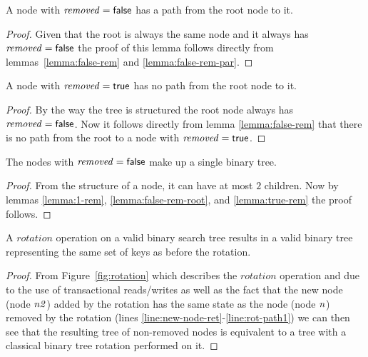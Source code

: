 \begin{lemma}
\label{lemma:false-rem-root}
A node with $\ms{removed}=\lit{false}$ has a path from the root node to it.
\end{lemma}
\begin{proof}
Given that the root is always the same node and it always has $\ms{removed}=\lit{false}$ the proof of this lemma follows directly
from lemmas~\ref{lemma:false-rem} and \ref{lemma:false-rem-par}.
\end{proof}


\begin{lemma}
\label{lemma:true-rem}
A node with $\ms{removed}=\lit{true}$ has no path from the root node to it.
\end{lemma}
\begin{proof}
By the way the tree is structured the root node always has $\ms{removed}=\lit{false}$.
Now it follows directly from lemma \ref{lemma:false-rem} that there is no path from the root to a node with $\ms{removed}=\lit{true}$.
\end{proof}


\begin{lemma}
\label{lemma:binary-tree}
The nodes with $\ms{removed}=\lit{false}$ make up a single binary tree.
\end{lemma}
\begin{proof}
From the structure of a node, it can have at most $2$ children.
Now by lemmas \ref{lemma:1-rem}, \ref{lemma:false-rem-root}, and \ref{lemma:true-rem} the proof follows.
\end{proof}



\begin{lemma}
\label{lemma:rotation-valid}
A $rotation$ operation on a valid binary search tree results in a valid binary tree
representing the same set of keys as before the rotation. %
\end{lemma}
\begin{proof}
From Figure~\ref{fig:rotation} which describes the $rotation$ operation and due to the use of transactional reads/writes
as well as the fact that the new node (node $\ms{n2}$) added by the rotation has the same state as the node (node $\ms{n}$) removed by the rotation
(lines \ref{line:new-node-ret}-\ref{line:rot-path1})
we can then see that the resulting tree of non-removed nodes is equivalent to a tree with a classical binary tree rotation performed on it.
\end{proof}


